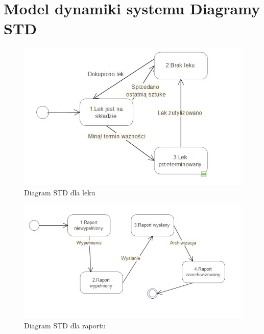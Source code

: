 \documentclass[a4paper, 11pt]{article}
\begin{document}
	\section{Model dynamiki systemu Diagramy STD}
	\begin{figure}[H]
\centerline{\includegraphics[scale=1]{STDlek.jpg}}
\caption{Diagram STD dla leku}
\end{figure}
	\begin{figure}[H]
\centerline{\includegraphics[scale=1]{STDraport.jpg}}
\caption{Diagram STD dla raportu}
\end{figure}
\end{document}
